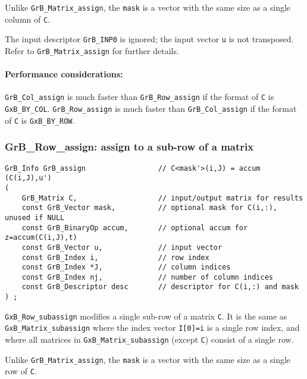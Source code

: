 \documentclass[12pt]{article}
\begin{document}
Unlike \verb'GrB_Matrix_assign', the \verb'mask' is a vector with the same size
as a single column of \verb'C'.

The input descriptor \verb'GrB_INP0' is ignored; the input vector \verb'u' is
not transposed.  Refer to \verb'GrB_Matrix_assign' for further details.

\paragraph{\bf Performance considerations:} %
\verb'GrB_Col_assign' is much faster than \verb'GrB_Row_assign' if the format
of \verb'C' is \verb'GxB_BY_COL'.  \verb'GrB_Row_assign' is much faster than
\verb'GrB_Col_assign' if the format of \verb'C' is \verb'GxB_BY_ROW'.

\newpage
\subsubsection{{\sf GrB\_Row\_assign:} assign to a sub-row of a matrix}
\label{assign_row}

\begin{mdframed}[userdefinedwidth=6in]
{\footnotesize
\begin{verbatim}
GrB_Info GrB_assign                 // C<mask'>(i,J) = accum (C(i,J),u')
(
    GrB_Matrix C,                   // input/output matrix for results
    const GrB_Vector mask,          // optional mask for C(i,:), unused if NULL
    const GrB_BinaryOp accum,       // optional accum for z=accum(C(i,J),t)
    const GrB_Vector u,             // input vector
    const GrB_Index i,              // row index
    const GrB_Index *J,             // column indices
    const GrB_Index nj,             // number of column indices
    const GrB_Descriptor desc       // descriptor for C(i,:) and mask
) ;
\end{verbatim} } \end{mdframed}

\verb'GxB_Row_subassign' modifies a single sub-row of a matrix \verb'C'.  It is
the same as \verb'GxB_Matrix_subassign' where the index vector \verb'I[0]=i' is
a single row index, and where all matrices in \verb'GxB_Matrix_subassign'
(except \verb'C') consist of a single row.

Unlike \verb'GrB_Matrix_assign', the \verb'mask' is a vector with the same size
as a single row of \verb'C'.
\end{document}
